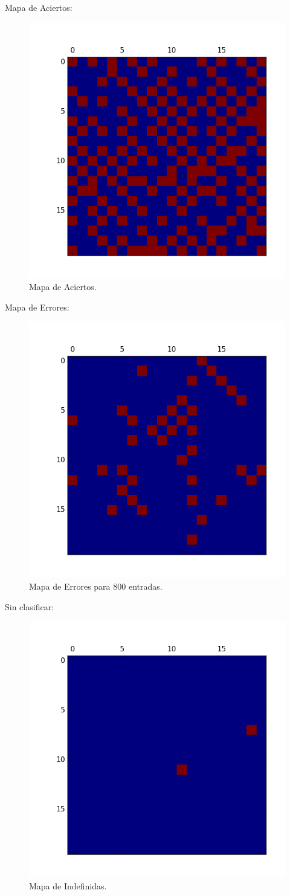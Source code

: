 Mapa de Aciertos:

\begin{figure}[H]
  \centering
  \includegraphics[width=0.5\columnwidth]{secciones/graficos/kohonen/mapaaciertosmejor.png}
  \caption{Mapa de Aciertos.}
  \label{fig:mapa aciertos}
\end{figure}

Mapa de Errores:


\begin{figure}[H]
  \centering
  \includegraphics[width=0.5\columnwidth]{secciones/graficos/kohonen/mapaerroresmejor.png}
  \caption{Mapa de Errores para 800 entradas.}
  \label{fig:mapa errores 800}
\end{figure}

Sin clasificar:


\begin{figure}[H]
  \centering
  \includegraphics[width=0.5\columnwidth]{secciones/graficos/kohonen/mapaindefinidasmejor.png}
  \caption{Mapa de Indefinidas.}
  \label{fig:mapa indefinidas}
\end{figure}


